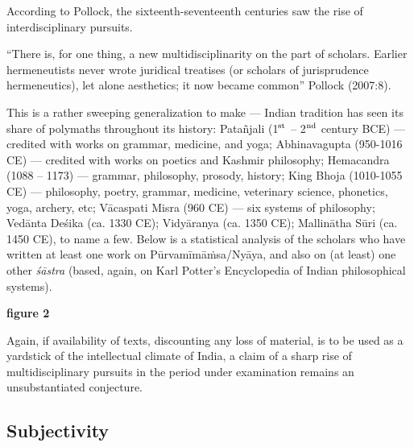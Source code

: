 According to Pollock, the sixteenth-seventeenth centuries saw the rise of interdisciplinary pursuits.

 “There is, for one thing, a new multidisciplinarity on the part of scholars. Earlier hermeneutists never wrote juridical treatises (or scholars of jurisprudence hermeneutics), let alone aesthetics; it now became common” Pollock (2007:8).

This is a rather sweeping generalization to make — Indian tradition has seen its share of polymaths throughout its history: Patañjali (1$^{\rm st}$ – 2$^{\rm nd}$ century BCE) — credited with works on grammar, medicine, and yoga; Abhinavagupta (950-1016 CE) — credited with works on poetics and Kashmir philosophy; Hemacandra (1088 – 1173) — grammar, philosophy, prosody, history; King Bhoja (1010-1055 CE) — philosophy, poetry, grammar, medicine, veterinary science, phonetics, yoga, archery, etc; Vācaspati Misra (960 CE) — six systems of philosophy; Vedānta Deśika (ca. 1330 CE); Vidyāranya (ca. 1350 CE); Mallinātha Sūri (ca. 1450 CE), to name a few. Below is a statistical analysis of the scholars who have written at least one work on Pūrvamīmāṁsa/Nyāya, and also on (at least) one other {\sl śāstra} (based, again, on Karl Potter’s Encyclopedia of Indian philosophical systems). 
\begin{center}
{\bf figure 2}
\end{center}

Again, if availability of texts, discounting any loss of material, is to be used as a yardstick of the intellectual climate of India, a claim of a sharp rise of multidisciplinary pursuits in the period under examination remains an unsubstantiated conjecture.

\subsection{Subjectivity}%

